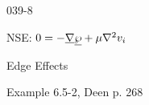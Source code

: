 \begin{mitframe}{039-8}


\begin{listone}

\item NSE: $0=-\gradop\uline{\dynpress}+\chempot\nabla^2\vvel_{\state}$

			\begin{listtwo}
            
            \item Edge Effects
            
            \item Example 6.5-2, Deen p. 268

\end{listtwo}
\end{listone}
\end{mitframe}